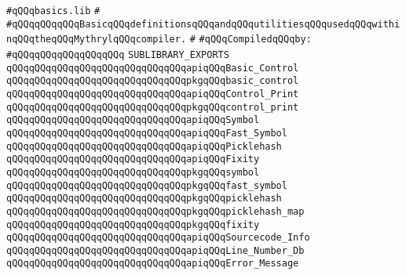 \label{src/lib/compiler/front/basics/basics.sublib}
\verb|#qQQqbasics.lib|\newline
\verb|#|\newline
\verb|#qQQqqQQqqQQqBasicqQQqdefinitionsqQQqandqQQqutilitiesqQQqusedqQQqwithinqQQqtheqQQqMythrylqQQqcompiler.|\newline
\verb|#|\newline
\newline
\verb|#qQQqCompiledqQQqby:|\newline
\verb|#qQQqqQQqqQQqqQQqqQQq|\newline
\newline
\verb|SUBLIBRARY_EXPORTS|\newline
\newline
\verb|qQQqqQQqqQQqqQQqqQQqqQQqqQQqqQQqapiqQQqBasic_Control|\newline
\verb|qQQqqQQqqQQqqQQqqQQqqQQqqQQqqQQqpkgqQQqbasic_control|\newline
\newline
\verb|qQQqqQQqqQQqqQQqqQQqqQQqqQQqqQQqapiqQQqControl_Print|\newline
\verb|qQQqqQQqqQQqqQQqqQQqqQQqqQQqqQQqpkgqQQqcontrol_print|\newline
\newline
\verb|qQQqqQQqqQQqqQQqqQQqqQQqqQQqqQQqapiqQQqSymbol|\newline
\verb|qQQqqQQqqQQqqQQqqQQqqQQqqQQqqQQqapiqQQqFast_Symbol|\newline
\verb|qQQqqQQqqQQqqQQqqQQqqQQqqQQqqQQqapiqQQqPicklehash|\newline
\verb|qQQqqQQqqQQqqQQqqQQqqQQqqQQqqQQqapiqQQqFixity|\newline
\verb|qQQqqQQqqQQqqQQqqQQqqQQqqQQqqQQqpkgqQQqsymbol|\newline
\verb|qQQqqQQqqQQqqQQqqQQqqQQqqQQqqQQqpkgqQQqfast_symbol|\newline
\verb|qQQqqQQqqQQqqQQqqQQqqQQqqQQqqQQqpkgqQQqpicklehash|\newline
\verb|qQQqqQQqqQQqqQQqqQQqqQQqqQQqqQQqpkgqQQqpicklehash_map|\newline
\verb|qQQqqQQqqQQqqQQqqQQqqQQqqQQqqQQqpkgqQQqfixity|\newline
\newline
\verb|qQQqqQQqqQQqqQQqqQQqqQQqqQQqqQQqapiqQQqSourcecode_Info|\newline
\verb|qQQqqQQqqQQqqQQqqQQqqQQqqQQqqQQqapiqQQqLine_Number_Db|\newline
\verb|qQQqqQQqqQQqqQQqqQQqqQQqqQQqqQQqapiqQQqError_Message|\newline

